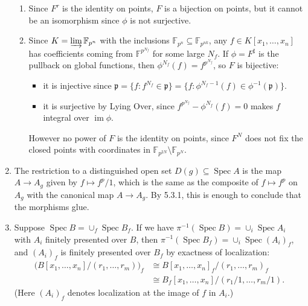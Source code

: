 \documentclass{report}
\newcommand{\colimit}{\varinjlim} %
\newcommand{\p}{\mathfrak{p}}
\newcommand{\F}{\mathbb{F}}
\DeclareMathOperator{\im}{im}
\DeclareMathOperator{\Spec}{Spec}
\begin{document}
\begin{enumerate}[label=\textbf{7.3.\Alph*.}]
\begin{enumerate}[label=(\alph*)]
		      \item Since $F^r$ is the identity on points, $F$ is a bijection on
		            points, but it cannot be an isomorphism since $\phi$ is not
		            surjective.

		      \item Since $K=\colimit\F_{p^n}$ with the inclusions
		            $\F_{p^n}\subseteq\F_{p^{nk}}$, any $f\in K[x_1,\ldots,x_n]$
		            has coefficients coming from $\F^{p^{N_f}}$ for some large
		            $N_f$. If $\phi=F^\sharp$ is the pullback on global functions,
		            then $\phi^{N_f}(f)=f^{p^{N_f}}$, so $F$ is bijective:
		            \begin{itemize}
			            \item it is injective since
			                  $\p=\{f:f^{N_f}\in\p\}=\{f:\phi^{N_f-1}(f)\in\phi^{-1}(\p)\}$.

			            \item it is surjective by Lying Over, since
			                  $f^{p^{N_f}}-\phi^{N_f}(f)=0$ makes $f$ integral over
			                  $\im\phi$.
		            \end{itemize}
		            However no power of $F$ is the identity on points, since
		            $F^N$ does not fix the closed points with coordinates in
		            $\F_{p^{2N}}\setminus\F_{p^N}$.
	      \end{enumerate}

	\item The restriction to a distinguished open set $D(g)\subseteq\Spec A$
	      is the map $A\to A_g$ given by $f\mapsto f^p/1$, which is the same as
	      the composite of $f\mapsto f^p$ on $A_g$ with the canonical map
	      $A\to A_g$. By 5.3.1, this is enough to conclude that the morphisms
	      glue.

	\item Suppose $\Spec B=\cup_f\Spec B_f$. If we have
	      $\pi^{-1}(\Spec B)=\cup_i\Spec A_i$ with $A_i$ finitely presented over
	      $B$, then $\pi^{-1}(\Spec B_f)=\cup_i\Spec(A_i)_f$, and $(A_i)_f$ is
	      finitely presented over $B_f$ by exactness of localization:
	      \begin{align*}
		      \bigl(B[x_1,\ldots,x_n]/(r_1,\ldots,r_m)\bigr)_f
		       & \cong B[x_1,\ldots,x_n]_f/(r_1,\ldots,r_m)_f    \\
		       & \cong B_f[x_1,\ldots,x_n]/(r_1/1,\ldots,r_m/1).
	      \end{align*}
	      (Here $(A_i)_f$ denotes localization at the image of $f$ in $A_i$.)


\end{enumerate}
\end{document}
